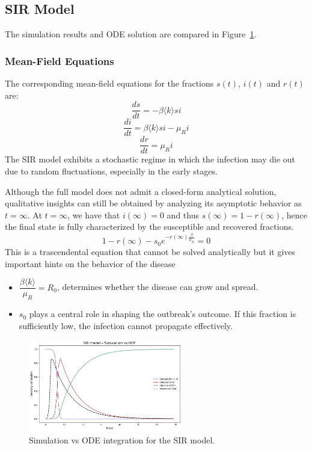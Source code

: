 \subsection{SIR Model}
The simulation results and ODE solution are compared in Figure~\ref{fig:sir_compare}.

\subsubsection{Mean-Field Equations}

The corresponding mean-field equations for the fractions $s(t)$, $i(t)$ and $r(t)$ are:
$$\dfrac{ds}{dt}=-\beta \langle k \rangle si$$ 
$$\dfrac{di}{dt}=\beta \langle k \rangle si - \mu_R i$$
$$\dfrac{dr}{dt}=\mu_R i$$
The SIR model exhibits a stochastic regime in which the infection may die out due to random fluctuations, especially in the early stages.

Although the full model does not admit a closed-form analytical solution, qualitative insights can still be obtained by analyzing its asymptotic behavior as $t=\infty$. 
At $t=\infty$, we have that $i(\infty)=0$ and thus $s(\infty)=1-r(\infty)$, hence the final state is fully characterized by the susceptible and recovered fractions.
$$1-r(\infty)-s_0e^{-r(\infty)\frac{\beta}{\mu_R}}=0$$
This is a trascendental equation that cannot be solved analytically but it gives important hints on the behavior of the disease 
\begin{itemize}
    \item $\dfrac{\beta \langle k \rangle}{\mu_R}=R_0$, determines whether the disease can grow and spread.
    \item $s_0$ plays a central role in shaping the outbreak's outcome. If this fraction is sufficiently low, the infection cannot propagate effectively.
\end{itemize}


\begin{figure}[H]
\centering
\includegraphics[width=0.6\textwidth]{images/Homogeneous/SIR_densities.png}
\caption{Simulation vs ODE integration for the SIR model.}
\label{fig:sir_compare}
\end{figure}

